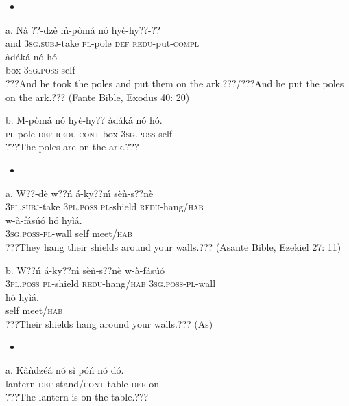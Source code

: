 \documentclass[output=paper]{langsci/langscibook}
\begin{document}
\begin{itemize}
\item \end{itemize}
\gll a.  N\`{a}  ??{}-dz\`{e}     \`{m}-p\`{o}m\'{a}   n\'{o}  hy\`{e}-hy??-?? \\
             and  \textsc{3sg.subj}{}-take  \textsc{pl}{}-pole    \textsc{def}  \textsc{redu}{}-put-\textsc{compl}  \\
\gll   \`{a}d\'{a}k\'{a}     n\'{o}    h\'{o}  \\
       box    \textsc{3sg.poss}  self  \\
\glt    ???And he took the poles and put them on the ark.???/???And he put the poles on the ark.??? (Fante Bible, Exodus 40: 20)
\z

\gll  b.  \`{M}-p\`{o}m\'{a}   n\'{o}   hy\`{e}-hy??   \`{a}d\'{a}k\'{a}  n\'{o}    h\'{o}.\\
       \textsc{pl}{}-pole    \textsc{def}  \textsc{redu-cont}  box  \textsc{3sg.poss}  self  \\
\glt   ???The poles are on the ark.???
\z

\begin{itemize}
\item \end{itemize}
\gll a.   W??-d\`{e}    w??\'{n}    \'{a}-ky??\'{m}   s\`{e}\`{n}-s??n\`{e} \\
       \textsc{3pl.subj}{}-take  \textsc{3pl.poss}  \textsc{pl}{}-shield  \textsc{redu}{}-hang/\textsc{hab}\\
\gll   w-\`{a}-f\'{a}s\'{u}\'{o}    h\'{o}   hy\`{i}\'{a}.    \\
       \textsc{3sg.poss-pl}{}-wall  self  meet/\textsc{hab}  \\
\glt ???They hang their shields around your walls.??? (Asante Bible, Ezekiel 27: 11)
\z

\gll  b.  W??\'{n}    \'{a}-ky??\'{m}    s\`{e}\`{n}-s??n\`{e}     w-\`{a}-f\'{a}s\'{u}\'{o} \\
       \textsc{3pl.poss}  \textsc{pl}{}-shield  \textsc{redu}{}-hang/\textsc{hab}  \textsc{3sg.poss-pl}{}-wall\\
\gll   h\'{o}  hy\`{i}\'{a}.\\
       self  meet/\textsc{hab}\\
\glt ???Their shields hang around your walls.??? (As)
\z

\begin{itemize}
\item \end{itemize}
\gll a.  K\`{a}\`{n}dz\'{e}\'{a}  n\'{o}  s\`{i}    p\'{o}\'{n}  n\'{o}  d\'{o}.\\
       lantern    \textsc{def}  stand/\textsc{cont}  table  \textsc{def}  on\\
\glt ???The lantern is on the table.???
\z
\end{document}
